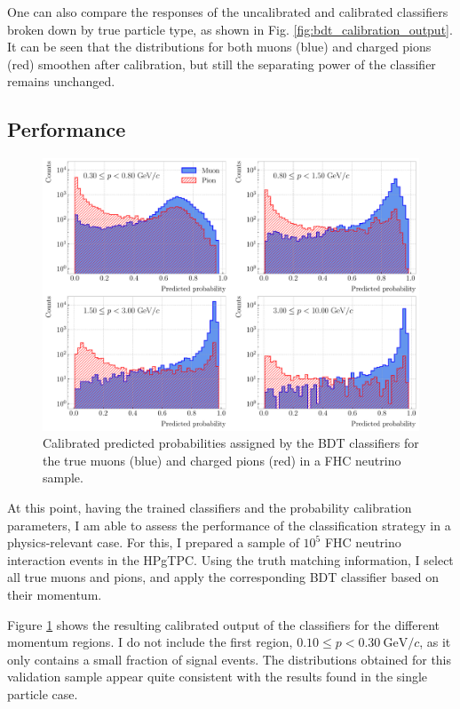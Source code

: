 One can also compare the responses of the uncalibrated and calibrated classifiers broken down by true particle type, as shown in Fig. \ref{fig:bdt_calibration_output}. It can be seen that the distributions for both muons (blue) and charged pions (red) smoothen after calibration, but still the separating power of the classifier remains unchanged.

\subsection{Performance}

\begin{figure}[t]
	\centering
	\includegraphics[width=.95\linewidth]{Images/GArSoft_PID/BDT/ecal_bdt_validation_output_regions.pdf}
	\caption[Calibrated predicted probabilities assigned by the BDT classifiers for the true muons and charged pions in a FHC neutrino sample.]{Calibrated predicted probabilities assigned by the BDT classifiers for the true muons (blue) and charged pions (red) in a FHC neutrino sample.}
	\label{fig:bdt_validation_output}
\end{figure}

At this point, having the trained classifiers and the probability calibration parameters, I am able to assess the performance of the classification strategy in a physics-relevant case. For this, I prepared a sample of $10^{5}$ FHC neutrino interaction events in the HPgTPC. Using the truth matching information, I select all true muons and pions, and apply the corresponding BDT classifier based on their momentum.

Figure \ref{fig:bdt_validation_output} shows the resulting calibrated output of the classifiers for the different momentum regions. I do not include the first region, $0.10 \leq p < 0.30 ~ \mathrm{GeV}/c$, as it only contains a small fraction of signal events. The distributions obtained for this validation sample appear quite consistent with the results found in the single particle case.

